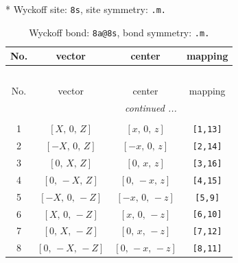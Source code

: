 \documentclass[fleqn,8pt]{jsarticle}
\begin{document}
* Wyckoff site: {\tt 8s}, site symmetry: {\tt .m.}
\renewcommand{\arraystretch}{1.2}
\begin{longtable}{cccc}
\caption{Wyckoff bond: {\tt 8a@8s}, bond symmetry: {\tt .m.}}
 \\
 \hline \hline
No. & vector & center & mapping \\ \hline \endfirsthead

\multicolumn{3}{l}{\tablename\ \thetable{}} \\
 \hline \hline
No. & vector & center & mapping \\ \hline \endhead

 \hline \hline
\multicolumn{3}{r}{\footnotesize\it continued ...} \\ \endfoot

 \hline \hline
\multicolumn{3}{r}{} \\ \endlastfoot

1 & $\left[ X,\, 0,\, Z \right]$ & $\left[ x,\, 0,\, z \right]$ & {\tt [1,13]} \\ \hline
2 & $\left[ - X,\, 0,\, Z \right]$ & $\left[ - x,\, 0,\, z \right]$ & {\tt [2,14]} \\ \hline
3 & $\left[ 0,\, X,\, Z \right]$ & $\left[ 0,\, x,\, z \right]$ & {\tt [3,16]} \\ \hline
4 & $\left[ 0,\, - X,\, Z \right]$ & $\left[ 0,\, - x,\, z \right]$ & {\tt [4,15]} \\ \hline
5 & $\left[ - X,\, 0,\, - Z \right]$ & $\left[ - x,\, 0,\, - z \right]$ & {\tt [5,9]} \\ \hline
6 & $\left[ X,\, 0,\, - Z \right]$ & $\left[ x,\, 0,\, - z \right]$ & {\tt [6,10]} \\ \hline
7 & $\left[ 0,\, X,\, - Z \right]$ & $\left[ 0,\, x,\, - z \right]$ & {\tt [7,12]} \\ \hline
8 & $\left[ 0,\, - X,\, - Z \right]$ & $\left[ 0,\, - x,\, - z \right]$ & {\tt [8,11]} \\
\end{longtable}
\renewcommand{\arraystretch}{1.2}
\end{document}
